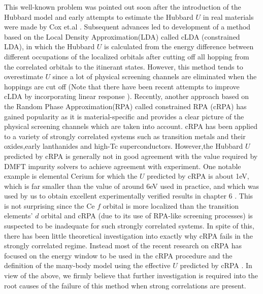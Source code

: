 \documentclass[10pt]{ruthesis}
\begin{document}
{This well-known problem was pointed out soon after the introduction of the Hubbard model and early attempts to estimate the Hubbard $U$ in real materials were made by Cox et.al \cite{IOP_HubbU_transition_metal_1973_B_N_Cox}. Subsequent advances led to development of a method based on the Local Density Approximation(LDA) called cLDA (constrained LDA),  in which the Hubbard $U$ is calculated from the energy difference between different occupations of the localized orbitals after cutting off all hopping from the correlated orbitals to the itinerant states\cite{PRB_cLDA_Cuprates_1988_McMahan,PRB_cLDA_cuprates_1989_Christensen,PRB_cLDA_Fe_Ce_1991_Anisirnov}.
However, this method tends to overestimate $U$ since a lot of physical screening channels are eliminated when the hoppings are cut off 
(Note that there have been recent attempts to improve cLDA by incorporating linear response \cite{PRB_linear_response_2005_Gironcoli}). 
Recently, another  approach based on the Random Phase Approximation(RPA) called constrained RPA (cRPA)\cite{PRB_CRPAMethodInvented_1998_F.Ary,PRB_lowenegymodel_for_firstprincilpes__2004_F.Ary} has  gained popularity as it is material-specific and provides a clear picture of the physical screening channels which are taken into account.  cRPA has been applied to a variety of strongly correlated systems such as transition metals and their oxides\cite{PRB_CalculationofHubU_cRPA._2006_F.Ary,PRB_cRPAonTransitionMetal_2008_F.ARy,PRB_cRPAonTransition_oxide_2012_S.Biermann,PRB_cRPAonTransition_oxide_2012_P.H.Zhang,PRB_cRPAonTrans_oxides_2013_F.Ary},early lanthanides\cite{PRB_cRPAonearlyLanthanide_2013_F.Ary,PRB_Screened_Coul_inter_cal_2014_F.Bruneval} and high-Tc superconductors\cite{JPSJ_lowenergyOFironbaseSC_2010_M.Imada,PRB_DyanmicScreening_LaCuO_2015_P.Werner_F.Ary}. However,the Hubbard $U$ predicted by cRPA is generally not in good agreement with the value required by DMFT impurity solvers to achieve agreement with experiment. One notable example \cite{PRB_Screened_Coul_inter_cal_2014_F.Bruneval} is elemental Cerium for which the $U$ predicted by cRPA is about 1eV, which is far smaller than the value of around 6eV used in practice, and which was used by us to obtain excellent experimentally verified results in chapter 6 . 
This is not surprising since the Ce $f$ orbital is more localized than the transition elements' $d$ orbital and cRPA (due to its use of RPA-like screening processes) is suspected to be inadequate for such strongly correlated systems. In spite of this, there has been little theoretical investigation into exactly why cRPA fails in the strongly correlated regime. Instead  most of the recent research on cRPA has focused on the energy window to be used in the cRPA procedure and the definition of the many-body model using the effective  $U$ predicted by cRPA \cite{PRB_cRPAonTrans_oxides_2013_F.Ary,JPSJ_lowenergyOFironbaseSC_2010_M.Imada}. In view of the above, we firmly believe that further investigation is required into the root causes of the failure of this method when strong correlations are present. 

}
\end{document}
